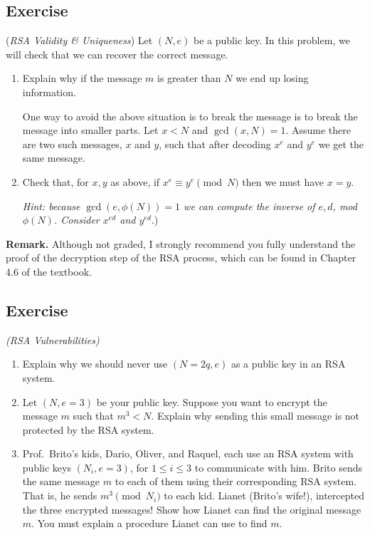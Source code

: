 \documentclass{article}
\newcounter{counter}
\newcommand{\Exercise}{Exercise \stepcounter{counter}\thecounter}
\begin{document}
\subsection*{\Exercise} 
    (\textit{RSA Validity \& Uniqueness}) Let $(N, e)$ be a public key. In this problem, we will check that we can recover the correct message.
    \begin{enumerate}
        \item Explain why if the message $m$ is greater than $N$ we end up losing information.
        
        \vspace{3mm}
        One way to avoid the above situation is to break the message is to break the message into smaller parts. Let $x < N$ and $\gcd(x, N) = 1$. Assume there are two such messages, $x$ and $y$, such that after decoding $x^{e}$ and $y^{e}$ we get the same message.
        \item Check that, for $x, y$ as above, if $x^{e} \equiv y^{e} \pmod{N}$ then we must have $x = y$. 
        
        \vspace{1mm} \textit{Hint: because $\gcd(e, \phi(N)) = 1$ we can compute the inverse of $e, d$, mod $\phi(N)$. Consider $x^{ed}$ and $y^{ed}$}.)
    \end{enumerate}
    
    \textbf{Remark. }Although not graded, I strongly recommend you fully understand the proof of the decryption step of the RSA process, which can be found in Chapter 4.6 of the textbook.


\subsection*{\Exercise}
    \textit{(RSA Vulnerabilities)}
    \begin{enumerate}
        \item Explain why we should never use $(N = 2q, e)$ as a public key in an RSA system.
        \item Let $(N, e = 3)$ be your public key. Suppose you want to encrypt the message $m$ such that $m^{3} < N$. Explain why sending this small message is not protected by the RSA system.
        \item Prof.\ Brito's kids, Dario, Oliver, and Raquel, each use an RSA system with public keys $(N_{i}, e = 3)$, for $1 \le i \le 3$ to communicate with him. Brito sends the same message $m$ to each of them using their corresponding RSA system. That is, he sends $m^{3} \pmod{N_{i}}$ to each kid. Lianet (Brito's wife!), intercepted the three encrypted messages! Show how Lianet can find the original message $m$. You must explain a procedure Lianet can use to find $m$.
    \end{enumerate}
\end{document}
